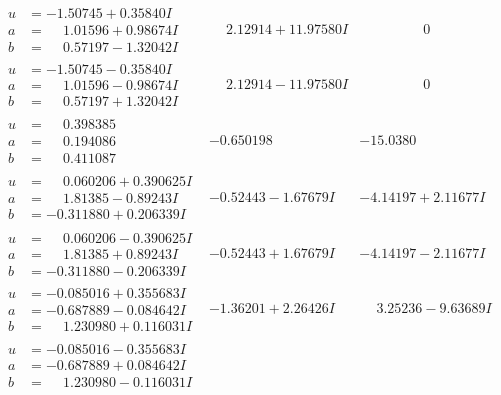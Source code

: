 \documentclass[1p]{elsarticle_modified}
\theoremstyle{definition}
\begin{document}
$$\begin{array}{c|c|c}
\begin{aligned}
u &= -1.50745 + 0.35840 I \\
a &= \phantom{-}1.01596 + 0.98674 I \\
b &= \phantom{-}0.57197 - 1.32042 I\end{aligned}
 & \phantom{-}2.12914 + 11.97580 I & \phantom{-0.000000 } 0 \\ \hline\begin{aligned}
u &= -1.50745 - 0.35840 I \\
a &= \phantom{-}1.01596 - 0.98674 I \\
b &= \phantom{-}0.57197 + 1.32042 I\end{aligned}
 & \phantom{-}2.12914 - 11.97580 I & \phantom{-0.000000 } 0 \\ \hline\begin{aligned}
u &= \phantom{-}0.398385\phantom{ +0.000000I} \\
a &= \phantom{-}0.194086\phantom{ +0.000000I} \\
b &= \phantom{-}0.411087\phantom{ +0.000000I}\end{aligned}
 & -0.650198\phantom{ +0.000000I} & -15.0380\phantom{ +0.000000I} \\ \hline\begin{aligned}
u &= \phantom{-}0.060206 + 0.390625 I \\
a &= \phantom{-}1.81385 - 0.89243 I \\
b &= -0.311880 + 0.206339 I\end{aligned}
 & -0.52443 - 1.67679 I & -4.14197 + 2.11677 I \\ \hline\begin{aligned}
u &= \phantom{-}0.060206 - 0.390625 I \\
a &= \phantom{-}1.81385 + 0.89243 I \\
b &= -0.311880 - 0.206339 I\end{aligned}
 & -0.52443 + 1.67679 I & -4.14197 - 2.11677 I \\ \hline\begin{aligned}
u &= -0.085016 + 0.355683 I \\
a &= -0.687889 - 0.084642 I \\
b &= \phantom{-}1.230980 + 0.116031 I\end{aligned}
 & -1.36201 + 2.26426 I & \phantom{-}3.25236 - 9.63689 I \\ \hline\begin{aligned}
u &= -0.085016 - 0.355683 I \\
a &= -0.687889 + 0.084642 I \\
b &= \phantom{-}1.230980 - 0.116031 I\end{aligned}

\end{array}$$
\end{document}

